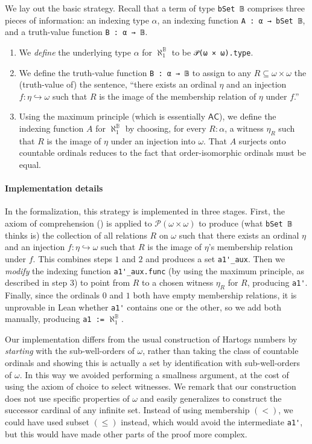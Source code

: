 \documentclass[sigplan,10pt,review, anonymous]{acmart}
\newcommand{\lil}{\lstinline}
\theoremstyle{definition}
\begin{document}
We lay out the basic strategy.
Recall that a term of type \lil{bSet 𝔹} comprises three pieces of information: an indexing type \(\alpha\), an indexing function \lil{A : α → bSet 𝔹}, and a truth-value function \lil{B : α → 𝔹}.
\begin{enumerate}
\item We \emph{define} the underlying type \(\alpha\) for \(\aleph_1^{\mathbb{B}}\) to be \lil{𝒫(ω × ω).type}.
\item We define the truth-value function \lil{B : α → 𝔹} to assign to any \(R \subseteq \omega \times \omega\) the (truth-value of) the sentence,
``there exists an ordinal \(\eta\) and an injection \(f : \eta \hookrightarrow \omega\) such that \(R\) is the image of the membership relation of \(\eta\) under \(f\).''

\item Using the maximum principle (which is essentially \(\mathsf{AC}\)), we define the indexing function \(A\) for \(\aleph_1^{\mathbb{B}}\) by choosing, for every \(R : \alpha\), a witness \(\eta_R\) such that \(R\) is the image of \(\eta\) under an injection into \(\omega\).
That \(A\) surjects onto countable ordinals reduces to the fact that order-isomorphic ordinals must be equal.
\end{enumerate}

\paragraph{Implementation details}
In the formalization, this strategy is implemented in three stages.
First, the axiom of comprehension () is applied to \(\mathcal{P}(\omega \times \omega)\) to produce (what \lil{bSet 𝔹} thinks is) the collection of all relations \(R\) on \(\omega\) such that there exists an ordinal \(\eta\) and an injection \(f : \eta \hookrightarrow \omega\) such that \(R\) is the image of \(\eta\)'s membership relation under \(f\).
This combines steps \(1\) and \(2\) and produces a set \lil{a1'_aux}. Then we \emph{modify} the indexing function \lil{a1'_aux.func} (by using the maximum principle, as described in step \(3\)) to point from \(R\) to a chosen witness \(\eta_R\) for \(R\), producing \lil{a1'}.
Finally, since the ordinals \(0\) and \(1\) both have empty membership relations, it is unprovable in Lean whether \lil{a1'} contains one or the other, so we add both manually, producing \lil{a1 :=} \(\aleph_1^{\mathbb{B}}\).

Our implementation differs from the usual construction of Hartogs numbers by \emph{starting} with the sub-well-orders of \(\omega\), rather than taking the class of countable ordinals and showing this is actually a set by identification with sub-well-orders of \(\omega\). In this way we avoided performing a smallness argument, at the cost of using the axiom of choice to select witnesses. We remark that our construction does not use specific properties of \(\omega\) and easily generalizes to construct the successor cardinal of any infinite set. Instead of using membership \((<)\), we could have used subset \((\leq)\) instead, which would avoid the intermediate \lil{a1'}, but this would have made other parts of the proof more complex.
\end{document}
